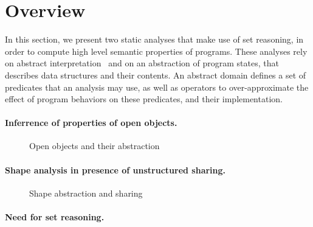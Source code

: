 \section{Overview}
\label{s:2:over}
In this section, we present two static analyses that make use of set
reasoning, in order to compute high level semantic properties of
programs.
These analyses rely on abstract interpretation~\cite{cc:popl:77} and
on an abstraction of program states, that describes data structures
and their contents.
An abstract domain defines a set of predicates that an analysis may
use, as well as operators to over-approximate the effect of program
behaviors on these predicates, and their implementation.

\paragraph{Inferrence of properties of open objects.}
\begin{figure}[t]
  \quad
  \caption{Open objects and their abstraction}
  \label{f:1:hoo}
\end{figure}
\cite{hoo:14:sas}

\paragraph{Shape analysis in presence of unstructured sharing.}
\begin{figure}[t]
  \quad
  \caption{Shape abstraction and sharing}
  \label{f:2:memcad}
\end{figure}
\cite{memcad:15:sas}

\paragraph{Need for set reasoning.}
